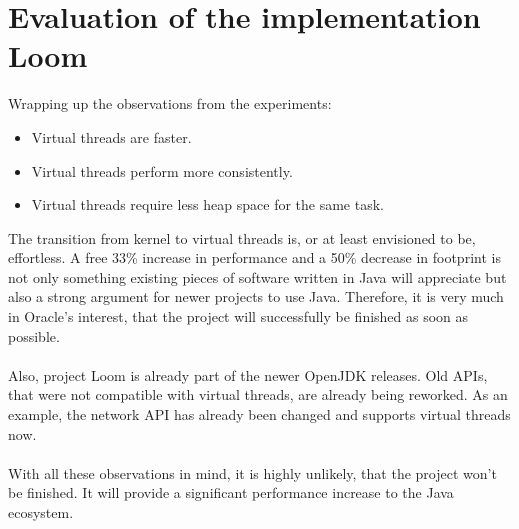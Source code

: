 \section{Evaluation of the implementation Loom}

Wrapping up the observations from the experiments:
\begin{itemize}
  \item Virtual threads are faster.
  \item Virtual threads perform more consistently.
  \item Virtual threads require less heap space for the same task.
\end{itemize}

The transition from kernel to virtual threads is, or at least envisioned to be, effortless. A free 33\% increase in performance and a 50\% decrease in footprint is not only something existing pieces of software written in Java will appreciate but also a strong argument for newer projects to use Java. Therefore, it is very much in Oracle's interest, that the project will successfully be finished as soon as possible. 
\\
\\
Also, project Loom is already part of the newer OpenJDK releases. Old APIs, that were not compatible with virtual threads, are already being reworked. As an example, the network API has already been changed and supports virtual threads now.
\\
\\
With all these observations in mind, it is highly unlikely, that the project won't be finished. It will provide a significant performance increase to the Java ecosystem.